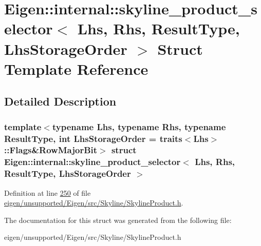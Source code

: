 \hypertarget{struct_eigen_1_1internal_1_1skyline__product__selector}{}\section{Eigen\+:\+:internal\+:\+:skyline\+\_\+product\+\_\+selector$<$ Lhs, Rhs, Result\+Type, Lhs\+Storage\+Order $>$ Struct Template Reference}
\label{struct_eigen_1_1internal_1_1skyline__product__selector}


\subsection{Detailed Description}
\subsubsection*{template$<$typename Lhs, typename Rhs, typename Result\+Type, int Lhs\+Storage\+Order = traits$<$\+Lhs$>$\+::\+Flags\&\+Row\+Major\+Bit$>$\newline
struct Eigen\+::internal\+::skyline\+\_\+product\+\_\+selector$<$ Lhs, Rhs, Result\+Type, Lhs\+Storage\+Order $>$}



Definition at line \hyperlink{eigen_2unsupported_2_eigen_2src_2_skyline_2_skyline_product_8h_source_l00250}{250} of file \hyperlink{eigen_2unsupported_2_eigen_2src_2_skyline_2_skyline_product_8h_source}{eigen/unsupported/\+Eigen/src/\+Skyline/\+Skyline\+Product.\+h}.



The documentation for this struct was generated from the following file\+:\begin{DoxyCompactItemize}
\item 
eigen/unsupported/\+Eigen/src/\+Skyline/\+Skyline\+Product.\+h\end{DoxyCompactItemize}

